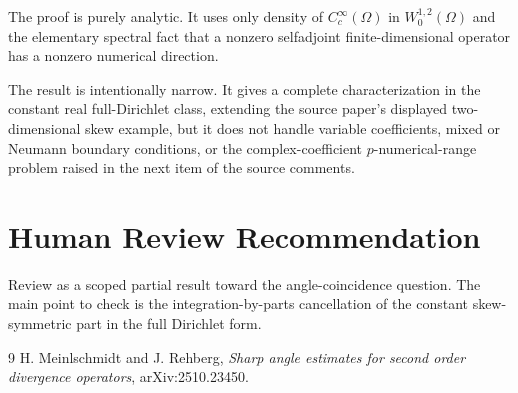 \documentclass[11pt]{amsart}
\begin{document}
The proof is purely analytic. It uses only density of $C_c^\infty(\Omega)$ in
$W^{1,2}_0(\Omega)$ and the elementary spectral fact that a nonzero
selfadjoint finite-dimensional operator has a nonzero numerical direction.

The result is intentionally narrow. It gives a complete characterization in
the constant real full-Dirichlet class, extending the source paper's displayed
two-dimensional skew example, but it does not handle variable coefficients,
mixed or Neumann boundary conditions, or the complex-coefficient
$p$-numerical-range problem raised in the next item of the source comments.

\section*{Human Review Recommendation}

Review as a scoped partial result toward the angle-coincidence question. The
main point to check is the integration-by-parts cancellation of the constant
skew-symmetric part in the full Dirichlet form.

\begin{thebibliography}{9}
H. Meinlschmidt and J. Rehberg,
\emph{Sharp angle estimates for second order divergence operators},
arXiv:2510.23450.
\end{thebibliography}
\end{document}
